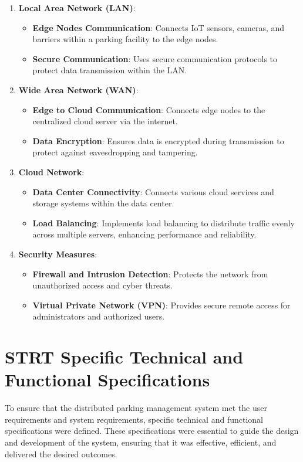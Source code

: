 \documentclass[oneside, 12pt, a4paper, draft]{book}
\begin{document}
\begin{enumerate}
\item \textbf{\textbf{Local Area Network (LAN)}}:
\begin{itemize}
\item \textbf{\textbf{Edge Nodes Communication}}: Connects IoT sensors, cameras, and barriers within a parking facility to the edge nodes.
\item \textbf{\textbf{Secure Communication}}: Uses secure communication protocols to protect data transmission within the LAN.
\end{itemize}

\item \textbf{\textbf{Wide Area Network (WAN)}}:
\begin{itemize}
\item \textbf{\textbf{Edge to Cloud Communication}}: Connects edge nodes to the centralized cloud server via the internet.
\item \textbf{\textbf{Data Encryption}}: Ensures data is encrypted during transmission to protect against eavesdropping and tampering.
\end{itemize}

\item \textbf{\textbf{Cloud Network}}:
\begin{itemize}
\item \textbf{\textbf{Data Center Connectivity}}: Connects various cloud services and storage systems within the data center.
\item \textbf{\textbf{Load Balancing}}: Implements load balancing to distribute traffic evenly across multiple servers, enhancing performance and reliability.
\end{itemize}

\item \textbf{\textbf{Security Measures}}:
\begin{itemize}
\item \textbf{\textbf{Firewall and Intrusion Detection}}: Protects the network from unauthorized access and cyber threats.
\item \textbf{\textbf{Virtual Private Network (VPN)}}: Provides secure remote access for administrators and authorized users.
\end{itemize}
\end{enumerate}
\section{{\bfseries\sffamily STRT} Specific Technical and Functional Specifications}
\label{sec:org1e06664}
To ensure that the distributed parking management system met the user requirements and system requirements, specific technical and functional specifications were defined.
These specifications were essential to guide the design and development of the system, ensuring that it was effective, efficient, and delivered the desired outcomes.
\end{document}
